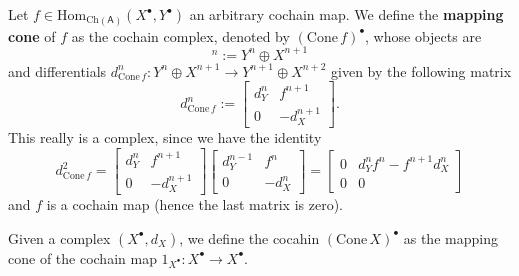 \begin{defn}
	Let $f \in \mathrm{Hom}_{\mathrm{Ch}(\mathsf{A})} \left( X^\bullet, Y^\bullet \right)$ an arbitrary cochain map.
	We define the \textbf{mapping cone} of $f$ as the cochain complex,
	denoted by $(\mathrm{Cone}\, f)^\bullet$, whose objects are
	\begin{equation}
		[\mathrm{Cone}\, f]^n := Y^n \oplus X^{n+1}
	\end{equation} 
	and differentials $d^n_{\mathrm{Cone}\, f}: Y^n \oplus X^{n+1} \to Y^{n+1} \oplus X^{n+2}$ given by
	the following matrix
	\begin{equation}
	d^n_{\mathrm{Cone}\, f} :=
	\begin{bmatrix}
		d^n_Y & f^{n+1}\\
		0 & -d_X^{n+1}
	\end{bmatrix} 
	.\end{equation} 
	This really is a complex, since we have the identity
	\begin{equation}
	d^2_{\mathrm{Cone}\, f} =
	\begin{bmatrix}
		d^n_Y & f^{n+1}\\
		0 & -d_X^{n+1}
	\end{bmatrix} 
	\begin{bmatrix}
		d^{n-1}_Y & f^{n}\\
		0 & -d_X^{n}
	\end{bmatrix}  = 
	\begin{bmatrix}
		0 & d^n_Y f^n - f^{n+1} d^n_X\\
		0 & 0
	\end{bmatrix} 
	\end{equation} 
	and $f$ is a cochain map (hence the last matrix is zero).
\end{defn}

\begin{defn}
	Given a complex $\left( X^{\bullet}, d_{X} \right)$, we define the cocahin $(\mathrm{Cone}\, X)^\bullet$ as the
	mapping cone of the cochain map $1_{X^\bullet}: X^\bullet \to X^\bullet$.
\end{defn}


